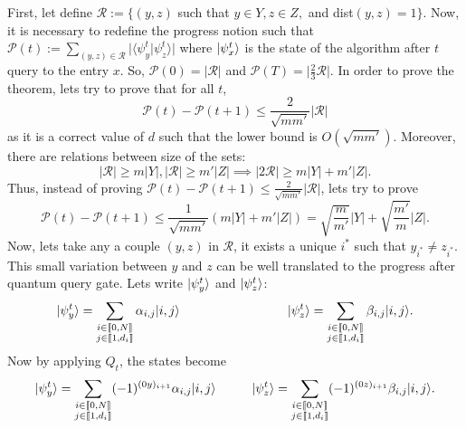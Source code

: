 \begin{appendix}
    \begin{tproof}
        First, let define $\mathcal{R}:= \{(y, z)$ such that $ y \in Y, z \in Z,$ and dist$(y,z)=1\}$.
        Now, it is necessary to redefine the progress notion such that
        $\mathcal{P}(t) := \sum_{(y,z) \in \mathcal{R}}\vert \langle \psi^t_y \vert \psi^t_z \rangle\vert$
        where $|\psi_x^t\rangle$ is the state of the algorithm after $t$ query to the entry $x$.
        So, $\mathcal{P}(0) = \vert \mathcal{R} \vert$ and $\mathcal{P}(T) = \vert \frac{2}{3}\mathcal{R} \vert$.
        In order to prove the theorem, lets try to prove that for all $t$,
        \[\mathcal{P}(t) - \mathcal{P}(t+1) \leq \frac{2}{\sqrt{m m'}}\vert \mathcal{R}\vert\]
        as it is a correct value
        of $d$ such that the lower bound is $O(\sqrt{mm'})$. Moreover, there are relations between size
        of the sets:
        \[\vert \mathcal{R} \vert \geq m \vert Y \vert, \vert \mathcal{R} \vert \geq m' \vert Z \vert
            \implies \vert 2\mathcal{R} \vert \geq m \vert Y \vert+ m' \vert Z \vert.\] Thus, instead of proving
        $\mathcal{P}(t) - \mathcal{P}(t+1) \leq \frac{2}{\sqrt{m m'}}\vert \mathcal{R}\vert$, lets try
        to prove
        \[\mathcal{P}(t) - \mathcal{P}(t+1) \leq \frac{1}{\sqrt{m m'}}(m \vert Y \vert+ m' \vert Z \vert)
            = \sqrt{\frac{m}{m'}} \vert Y \vert + \sqrt{\frac{m'}{m}}\vert Z \vert.\]
        Now, lets take any a couple $(y,z)$ in $\mathcal{R}$, it exists a unique $i^*$ such that $y_{i^*} \neq z_{i^*}$.
        This small variation between $y$ and $z$ can be well translated to the progress after quantum query gate.
        Lets write $|\psi^{t}_y\rangle$ and $|\psi^{t}_z\rangle$: \\
        \[\ket{\psi^{t}_y} = \sum_{\substack{i \in \llbracket0,N\rrbracket\\j \in \llbracket1, d_i\rrbracket}}\alpha_{i,j} \ket{i,j} \hspace*{3cm }
            \ket{\psi^{t}_z} = \sum_{\substack{i \in \llbracket0,N\rrbracket\\j \in \llbracket1, d_i\rrbracket}}\beta_{i,j} \ket{i,j}.\]
        Now by applying $Q_t$, the states become
        \[|\psi^{t}_y\rangle = \sum_{\substack{i \in \llbracket0,N\rrbracket\\j \in \llbracket1, d_i\rrbracket}} (-1)^{(0y)_{i+1}}\alpha_{i,j} |i,j\rangle \hspace*{1cm }
            |\psi^{t}_z\rangle = \sum_{\substack{i \in \llbracket0,N\rrbracket\\j \in \llbracket1, d_i\rrbracket}}(-1)^{(0z)_{i+1}}\beta_{i,j} |i,j\rangle.\]

\end{tproof}
\end{appendix}
